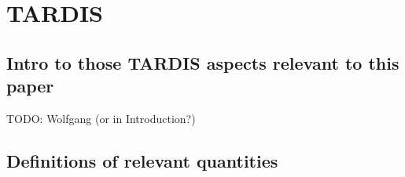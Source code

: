 \documentclass[11pt]{article}
\begin{document}
\section{TARDIS}

\subsection{Intro to those TARDIS aspects relevant to this paper}

TODO: Wolfgang (or in Introduction?)

\subsection{Definitions of relevant quantities}
\label{sec:dfnr}
\end{document}
